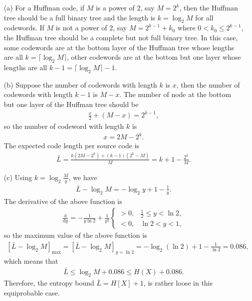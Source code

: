 \documentclass{assignment}
\begin{document}
\begin{sol}
    \begin{itemize}
        \item[(a)] For a Huffman code, if $M$ is a power of $2$, say $M=2^k$, then the Huffman tree should be a full binary tree and the length is $k=\log_2M$ for all codewords. If $M$ is not a power of $2$, say $M=2^{k-1}+k_0$ where $0<k_0\leq 2^{k-1}$, the Huffman tree should be a complete but not full binary tree. In this case, some codewords are at the bottom layer of the Huffman tree whose lengths are all $k=\lceil\log_2M\rceil$, other codewords are at the bottom but one layer whose lengths are all $k-1=\lceil\log_2M\rceil-1$.
        \item[(b)] Suppose the number of codewords with length $k$ is $x$, then the number of codewords with length $k-1$ is $M-x$. The number of node at the bottom but one layer of the Huffman tree should be
        \begin{align}
            \frac{x}{2}+(M-x)=2^{k-1},
        \end{align}
        so the number of codeword with length $k$ is
        \begin{align}
            x=2M-2^k.
        \end{align}
        The expected code length per source code is
        \begin{align}
            \bar{L}=\frac{k(2M-2^k)+(k-1)(2^k-M)}{M}=k+1-\frac{2^k}{M}.
        \end{align}
        \item[(c)] Using $k=\log_2\frac{M}{y}$, we have
        \begin{align}
            \bar{L}-\log_2M=-\log_2y+1-\frac{1}{y}.
        \end{align}
        The derivative of the above function is
        \begin{align}
            \frac{\mathrm{d}}{\mathrm{d}y}=-\frac{1}{y\ln 2}+\frac{1}{y^2}\left\{\begin{array}{ll}
                >0,&\frac{1}{2}\leq y<\ln 2,\\
                <0,&\ln 2<y<1,
            \end{array}\right.
        \end{align}
        so the maximum value of the above function is
        \begin{align}
            \left[\bar{L}-\log_2M\right]_{\max}=\left[\bar{L}-\log_2M\right]_{y=\ln 2}=-\log_2(\ln 2)+1-\frac{1}{\ln 2}=0.086,
        \end{align}
        which means that
        \begin{align}
            \bar{L}\leq\log_2M+0.086\leq H(X)+0.086.
        \end{align}
        Therefore, the entropy bound $\bar{L}=H[X]+1$, is rather loose in this equiprobable case.
    \end{itemize}
\end{sol}
\end{document}
